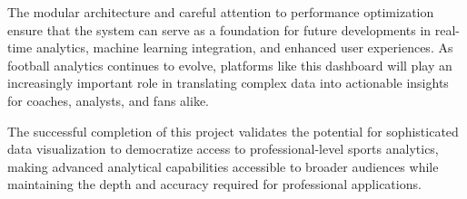 \documentclass[12pt,a4paper]{article}
\begin{document}
The modular architecture and careful attention to performance optimization ensure that the system can serve as a foundation for future developments in real-time analytics, machine learning integration, and enhanced user experiences. As football analytics continues to evolve, platforms like this dashboard will play an increasingly important role in translating complex data into actionable insights for coaches, analysts, and fans alike.

The successful completion of this project validates the potential for sophisticated data visualization to democratize access to professional-level sports analytics, making advanced analytical capabilities accessible to broader audiences while maintaining the depth and accuracy required for professional applications.
\end{document}

